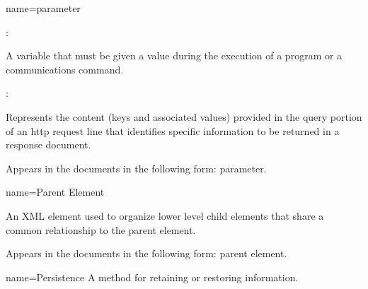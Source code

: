 {
  name={parameter}
}
{
	:

	A variable that must be given a value during the execution of a program or a communications command.

	:

	Represents the content (keys and associated values) provided in the \gls{query} portion of an \gls{http request line} that identifies specific information to be returned in a \gls{response document}.

	Appears in the documents in the following form: parameter.
}


{
  name={Parent Element}
}
{
	An XML element used to organize \gls{lower level} child elements that share a common relationship to the \gls{parent element}.

	Appears in the documents in the following form: \gls{parent element}.
}


{
  name={Persistence}
}
{
	A method for retaining or restoring information.
}


